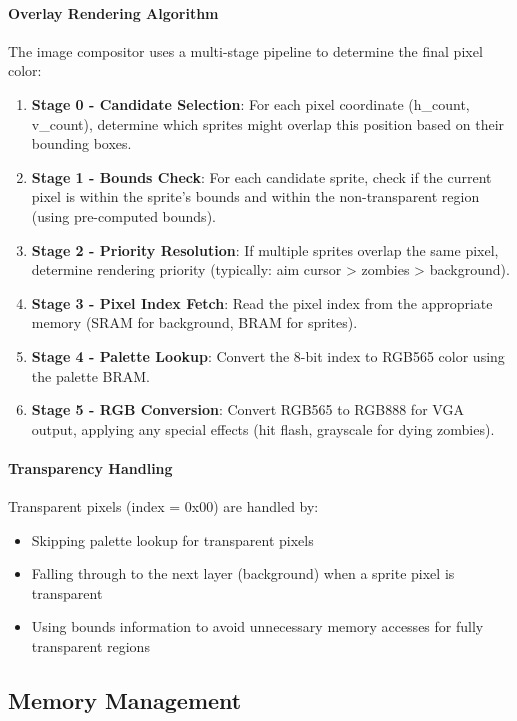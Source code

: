 \documentclass[12pt,a4paper]{article}
\begin{document}
\paragraph{Overlay Rendering Algorithm}
The image compositor uses a multi-stage pipeline to determine the final pixel color:
\begin{enumerate}
    \item \textbf{Stage 0 - Candidate Selection}: For each pixel coordinate (h\_count, v\_count), determine which sprites might overlap this position based on their bounding boxes.
    \item \textbf{Stage 1 - Bounds Check}: For each candidate sprite, check if the current pixel is within the sprite's bounds and within the non-transparent region (using pre-computed bounds).
    \item \textbf{Stage 2 - Priority Resolution}: If multiple sprites overlap the same pixel, determine rendering priority (typically: aim cursor > zombies > background).
    \item \textbf{Stage 3 - Pixel Index Fetch}: Read the pixel index from the appropriate memory (SRAM for background, BRAM for sprites).
    \item \textbf{Stage 4 - Palette Lookup}: Convert the 8-bit index to RGB565 color using the palette BRAM.
    \item \textbf{Stage 5 - RGB Conversion}: Convert RGB565 to RGB888 for VGA output, applying any special effects (hit flash, grayscale for dying zombies).
\end{enumerate}

\paragraph{Transparency Handling}
Transparent pixels (index = 0x00) are handled by:
\begin{itemize}
    \item Skipping palette lookup for transparent pixels
    \item Falling through to the next layer (background) when a sprite pixel is transparent
    \item Using bounds information to avoid unnecessary memory accesses for fully transparent regions
\end{itemize}

\subsection{Memory Management}
\end{document}
